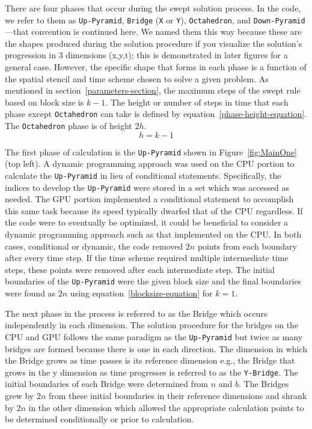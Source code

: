 \documentclass[journal,article,submit,moreauthors,pdftex]{Definitions/mdpi}
\def\Up{\texttt{Up-Pyramid}}
\def\Down{\texttt{Down-Pyramid}}
\def\Oct{\texttt{Octahedron}}
\def\Yb{\texttt{Y-Bridge}}
\begin{document}
\par
There are four phases that occur during the swept solution process. In the code, we refer to them as \Up{}, \texttt{Bridge} (\texttt{X} or \texttt{Y}), \Oct{}, and \Down{}---that convention is continued here. We named them this way because these are the shapes produced during the solution procedure if you visualize the solution's progression in 3 dimensions (x,y,t); this is demonstrated in later figures for a general case. However, the specific shape that forms in each phase is a function of the spatial stencil and time scheme chosen to solve a given problem. As mentioned in section~\ref{parameters-section}, the maximum steps of the swept rule based on block size is $k-1$. The height or number of steps in time that each phase except \Oct{} can take is defined by equation~\ref{phase-height-equation}. The \Oct{} phase is of height $2h$.
\begin{equation}
    \label{phase-height-equation}
    h=k-1
\end{equation}
 
\par
The first phase of calculation is the \Up{} shown in Figure~\ref{fig:MainOne} (top left). A dynamic programming approach was used on the CPU portion to calculate the \Up{} in lieu of conditional statements. Specifically, the indices to develop the \Up{} were stored in a set which was accessed as needed. The GPU portion implemented a conditional statement to accomplish this same task because its speed typically dwarfed that of the CPU regardless. If the code were to eventually be optimized, it could be beneficial to consider a dynamic programming approach such as that implemented on the CPU. In both cases, conditional or dynamic, the code removed $2n$ points from each boundary after every time step. If the time scheme required multiple intermediate time steps, these points were removed after each intermediate step. The initial boundaries of the \Up{} were the given block size and the final boundaries were found as $2n$ using equation~\ref{blocksize-equation} for $k=1$.

\par The next phase in the process is referred to as the Bridge which occurs independently in each dimension. The solution procedure for the bridges on the CPU and GPU follows the same paradigm as the \Up{} but twice as many bridges are formed because there is one in each direction. The dimension in which the Bridge grows as time passes is its reference dimension e.g., the Bridge that grows in the y dimension as time progresses is referred to as the \Yb{}. The initial boundaries of each Bridge were determined from $n$ and $b$. The Bridges grew by $2n$ from these initial boundaries in their reference dimensions and shrank by $2n$ in the other dimension which allowed the appropriate calculation points to be determined conditionally or prior to calculation.
\end{document}
